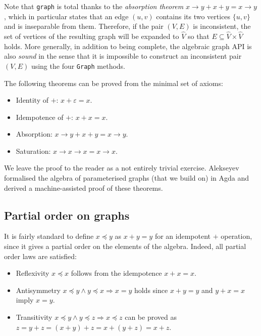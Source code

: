 \documentclass[acmlarge,anonymous]{acmart}\settopmatter{printfolios=true}
\newcommand{\hs}{\texttt}
\begin{document}
Note that \hs{graph} is total thanks to the \emph{absorption theorem}
$x \rightarrow y + x + y = x \rightarrow y$, which in particular states that
an edge $(u,v)$ contains its two vertices $\{u,v\}$ and is inseparable
from them. Therefore, if the pair $(V,E)$ is inconsistent, the set of vertices of
the resulting graph will be expanded to $\hat{V}$ so that
$E\subseteq \hat{V}\times \hat{V}$ holds. More generally,
in addition to being complete, the algebraic graph API is also \emph{sound} in
the sense that it is impossible to construct an inconsistent pair $(V,E)$
using the four \hs{Graph} methods.

The following theorems can be proved from the minimal set of axioms:

\begin{itemize}
    \item Identity of $+$: $x + \varepsilon = x$.
    \item Idempotence of $+$: $x + x = x$.
    \item Absorption: $x \rightarrow y + x + y = x \rightarrow y$.
    \item Saturation: $x \rightarrow x \rightarrow x = x \rightarrow x$.
\end{itemize}

We leave the proof to the reader as a not entirely trivial exercise.
Alekseyev~\citeyear{2014_alekseyev_phd} formalised the algebra of
parameterised graphs (that we build on) in Agda and derived a
machine-assisted proof of these theorems.

\subsection{Partial order on graphs}\label{sub-partial-order}

It is fairly standard to define $x \preceq y$ as $x + y = y$ for an
idempotent $+$ operation, since it gives a partial order on the elements
of the algebra. Indeed, all partial order laws are satisfied:

\begin{itemize}
     \item Reflexivity $x \preceq x$ follows from the idempotence $x + x = x$.
     \item Antisymmetry $x \preceq y \wedge y \preceq x \Rightarrow x = y$ holds
     since $x + y = y$ and $y + x = x$ imply $x = y$.
     \item Transitivity $x \preceq y \wedge y \preceq z \Rightarrow x \preceq z$
     can be proved as $z = y + z = (x + y) + z = x + (y + z) = x + z$.
 \end{itemize}
\end{document}
